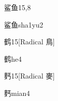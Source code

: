\begin{entry}{鲨鱼}{15,8}
  \begin{phonetics}{鲨鱼}{sha1yu2}
  \end{phonetics}
\end{entry}

\begin{entry}{鹤}{15}[Radical 鳥]
  \begin{phonetics}{鹤}{he4}
  \end{phonetics}
\end{entry}

\begin{entry}{麫}{15}[Radical 麥]
  \begin{phonetics}{麫}{mian4}
  \end{phonetics}
\end{entry}


